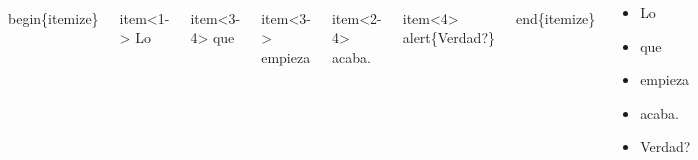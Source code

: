 \documentclass[11pt]{beamer}
\begin{document}
\begin{frame}

\begin{block}{}

\begin{columns}
\begin{semiverbatim}\scriptsize
\\begin\{itemize\}
\end{semiverbatim}

\begin{semiverbatim}\scriptsize
 \\item<1-> Lo
\end{semiverbatim}

\begin{semiverbatim}\scriptsize
 \\item<3-4> que
\end{semiverbatim}

\begin{semiverbatim}\scriptsize
 \\item<3-> empieza
\end{semiverbatim}

\begin{semiverbatim}\scriptsize
 \\item<2-4> acaba.
\end{semiverbatim}

\begin{semiverbatim}\scriptsize
 \\item<4> \\alert\{Verdad?\}
\end{semiverbatim}

\begin{semiverbatim}\scriptsize
\\end\{itemize\}
\end{semiverbatim}



\begin{itemize}
\item<1-> Lo   \item<3-4> que  \item<3-> empieza
\item<2-3> acaba. \item<4>\alert{Verdad?}
\end{itemize}


\end{columns}
\end{block}






\end{frame}
\end{document}
